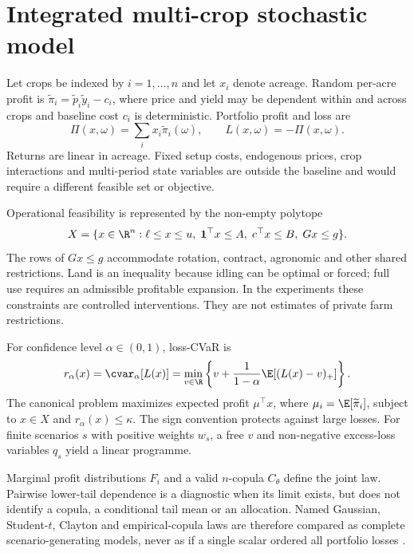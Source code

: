 \section{Integrated multi-crop stochastic model}

Let crops be indexed by $i=1,\ldots,n$ and let $x_i$ denote acreage. Random per-acre profit is $\widetilde\pi_i=\widetilde p_i\widetilde y_i-c_i$, where price and yield may be dependent within and across crops and baseline cost $c_i$ is deterministic. Portfolio profit and loss are
\begin{equation}
\Pi(x,\omega)=\sum_i x_i\widetilde\pi_i(\omega),\qquad L(x,\omega)=-\Pi(x,\omega).
\end{equation}
Returns are linear in acreage. Fixed setup costs, endogenous prices, crop interactions and multi-period state variables are outside the baseline and would require a different feasible set or objective.

Operational feasibility is represented by the non-empty polytope
\begin{equation}
X=\{x\in\R^n:\ell\leq x\leq u,\;\mathbf 1^\top x\leq A,\;c^\top x\leq B,\;Gx\leq g\}.
\label{eq:feasible}
\end{equation}
The rows of $Gx\leq g$ accommodate rotation, contract, agronomic and other shared restrictions. Land is an inequality because idling can be optimal or forced; full use requires an admissible profitable expansion. In the experiments these constraints are controlled interventions. They are not estimates of private farm restrictions.

For confidence level $\alpha\in(0,1)$, loss-CVaR is
\begin{equation}
r_\alpha(x)=\cvar_\alpha[L(x)]=\min_{v\in\R}\left\{v+\frac{1}{1-\alpha}\E[(L(x)-v)_+]\right\}.
\label{eq:cvar}
\end{equation}
The canonical problem maximizes expected profit $\mu^\top x$, where $\mu_i=\E[\widetilde\pi_i]$, subject to $x\in X$ and $r_\alpha(x)\leq\kappa$. The sign convention protects against large losses. For finite scenarios $s$ with positive weights $w_s$, a free $v$ and non-negative excess-loss variables $q_s$ yield a linear programme.

Marginal profit distributions $F_i$ and a valid $n$-copula $C_\theta$ define the joint law. Pairwise lower-tail dependence is a diagnostic when its limit exists, but does not identify a copula, a conditional tail mean or an allocation. Named Gaussian, Student-$t$, Clayton and empirical-copula laws are therefore compared as complete scenario-generating models, never as if a single scalar ordered all portfolio losses \citep{demarta2005tcopula,ansari2024dependence}.

